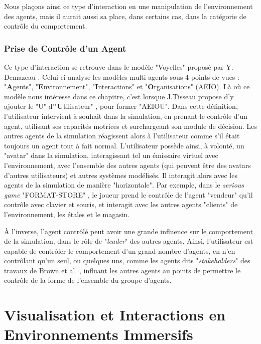 		Nous plaçons ainsi ce type d'interaction en une manipulation de l'environnement des agents, mais il aurait aussi sa place, dans certains cas, dans la catégorie de contrôle du comportement.
	
	\subsubsection{Prise de Contrôle d'un Agent}
		Ce type d'interaction se retrouve dans le modèle "Voyelles" proposé par Y. Demazeau \cite{demazeau_interactions_1995}. Celui-ci analyse les modèles multi-agents sous 4 points de vues : "\textbf{A}gents", "\textbf{E}nvironnement", "\textbf{I}nteractions" et "\textbf{O}rganisations" (AEIO). Là où ce modèle nous intéresse dans ce chapitre, c'est lorsque J.Tisseau propose d'y ajouter le "U" d'"\textbf{U}tilisateur" \cite{tisseau_realite_2001}, pour former "AEIOU". Dans cette définition, l'utilisateur intervient à souhait dans la simulation, en prenant le contrôle d'un agent, utilisant ses capacités motrices et surchargeant son module de décision. Les autres agents de la simulation réagissent alors à l'utilisateur comme s'il était toujours un agent tout à fait normal. 
		L'utilisateur possède ainsi, à volonté, un "avatar" dans la simulation, interagissant tel un émissaire virtuel avec l'environnement, avec l'ensemble des autres agents (qui peuvent être des avatars d'autres utilisateurs) et autres systèmes modélisés. Il interagit alors avec les agents de la simulation de manière "horizontale". Par exemple, dans le \textit{serious game} "FORMAT-STORE" \cite{mathieu_serious_2011}, le joueur prend le contrôle de l'agent "vendeur" qu'il contrôle avec clavier et souris, et interagit avec les autres agents "clients" de l'environnement, les étales et le magasin.
		
		À l'inverse, l'agent contrôlé peut avoir une grande influence sur le comportement de la simulation, dans le rôle de "\textit{leader}" des autres agents. Ainsi, l'utilisateur est capable de contrôler le comportement d'un grand nombre d'agents, en n'en contrôlant qu'un seul, ou quelques uns, comme les agents dits "\textit{stakeholders}" des travaux de Brown et al. \cite{brown_human-swarm_2014}, influant les autres agents au points de permettre le contrôle de la forme de l'ensemble du groupe d'agents.
	
	
	\section{Visualisation et Interactions en Environnements Immersifs}	
	
